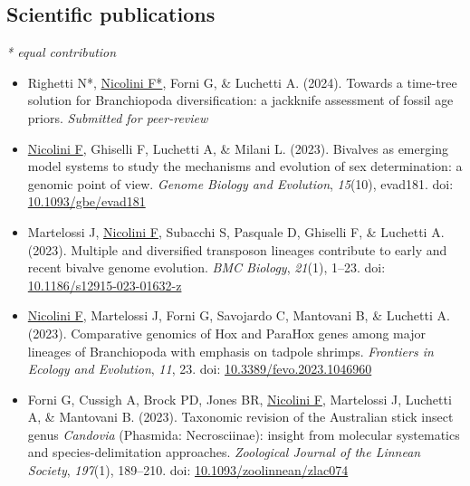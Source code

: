 \subsection*{Scientific publications}
\small{\textit{* equal contribution}}
\begin{itemize}
    \item Righetti N*, \underline{Nicolini F*}, Forni G, \& Luchetti A. (2024). Towards a time-tree solution for Branchiopoda diversification: a jackknife assessment of fossil age priors. \textit{Submitted for peer-review}
    \item \underline{Nicolini F}, Ghiselli F, Luchetti A, \& Milani L. (2023). Bivalves as emerging model systems to study the mechanisms and evolution of sex determination: a genomic point of view. \textit{Genome Biology and Evolution}, \textit{15}(10), evad181. doi: \href{https://doi.org/10.1093/gbe/evad181}{10.1093/gbe/evad181}
    \item Martelossi J, \underline{Nicolini F}, Subacchi S, Pasquale D, Ghiselli F, \& Luchetti A. (2023). Multiple and diversified transposon lineages contribute to early and recent bivalve genome evolution. \textit{BMC Biology}, \textit{21}(1), 1--23. doi: \href{https://doi.org/10.1186/s12915-023-01632-z}{10.1186/s12915-023-01632-z}
    \item \underline{Nicolini F}, Martelossi J, Forni G, Savojardo C, Mantovani B, \& Luchetti A. (2023). Comparative genomics of Hox and ParaHox genes among major lineages of Branchiopoda with emphasis on tadpole shrimps. \textit{Frontiers in Ecology and Evolution}, \textit{11}, 23. doi: \href{https://doi.org/10.3389/fevo.2023.1046960}{10.3389/fevo.2023.1046960}
    \item Forni G, Cussigh A, Brock PD, Jones BR, \underline{Nicolini F}, Martelossi J, Luchetti A, \& Mantovani B. (2023). Taxonomic revision of the Australian stick insect genus \textit{Candovia} (Phasmida: Necrosciinae): insight from molecular systematics and species-delimitation approaches. \textit{Zoological Journal of the Linnean Society}, \textit{197}(1), 189--210. doi: \href{https://doi.org/10.1093/zoolinnean/zlac074}{10.1093/zoolinnean/zlac074}
\end{itemize}
